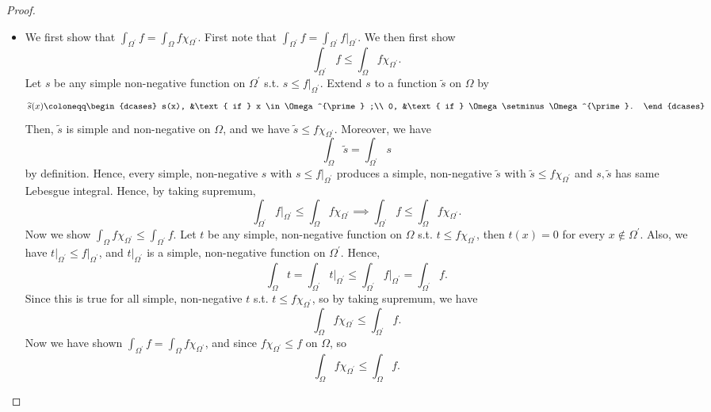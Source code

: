 \begin{proof}
\begin{itemize}
    \item [(e)] We first show that \(\int _{\Omega ^{\prime} } f = \int _{\Omega } f \chi _{\Omega ^{\prime} }\). First note that \(\int _{\Omega ^{\prime} } f = \int _{\Omega ^{\prime} } f\vert_{\Omega ^{\prime} }\). We then first show 
    \[
        \int _{\Omega ^{\prime} } f \le \int _\Omega f \chi _{\Omega ^{\prime} }.
    \]
    Let \(s\) be any simple non-negative function on \(\Omega ^{\prime} \) s.t. \(s \le f\vert_{\Omega ^{\prime} }\). Extend \(s\) to a function \(\widetilde{s} \) on \(\Omega \) by 
    \[
        \widetilde{s}(x) \coloneqq \begin{dcases}
            s(x), &\text{ if } x \in \Omega ^{\prime} ;\\
            0, &\text{ if } \Omega \setminus \Omega ^{\prime}.
        \end{dcases} 
    \]      
    Then, \(\widetilde{s} \) is simple and non-negative on \(\Omega\), and we have \(\widetilde{s} \le f \chi _{\Omega ^{\prime}} \). Moreover, we have 
    \[
        \int _{\Omega } \widetilde{s} = \int _{\Omega ^{\prime} } s 
    \]   
    by definition. Hence, every simple, non-negative \(s\) with \(s \le f\vert_{\Omega ^{\prime} }\) produces a simple, non-negative \(\widetilde{s}  \) with \(\widetilde{s} \le f \chi _{\Omega ^{\prime} } \) and \(s, \widetilde{s} \) has same Lebesgue integral. Hence, by taking supremum,
    \[
        \int _{\Omega ^{\prime} } f\vert_{\Omega ^{\prime} } \le \int _{\Omega } f \chi _{\Omega ^{\prime} } \implies \int _{\Omega ^{\prime} } f \le \int _{\Omega } f \chi _{\Omega ^{\prime} }.
    \]   
    Now we show \(\int _{\Omega } f \chi _{\Omega ^{\prime} } \le \int _{\Omega ^{\prime} } f\). Let \(t\) be any simple, non-negative function on \(\Omega\) s.t. \(t \le f \chi _{\Omega ^{\prime} }\), then \(t(x) = 0\) for every \(x \notin \Omega ^{\prime} \). Also, we have \(t\vert_{\Omega ^{\prime} } \le f \vert_{\Omega ^{\prime} }\), and \(t\vert_{\Omega ^{\prime} }\) is a simple, non-negative function on \(\Omega ^{\prime} \). Hence,
    \[
        \int _{\Omega } t = \int _{\Omega ^{\prime} } t\vert_{\Omega ^{\prime} } \le \int _{\Omega ^{\prime} } f\vert_{\Omega ^{\prime} } = \int _{\Omega ^{\prime} } f.
    \]         
    Since this is true for all simple, non-negative \(t\) s.t. \(t \le f \chi _{\Omega ^{\prime} }\), so by taking supremum, we have 
    \[
        \int _\Omega f \chi _{\Omega ^{\prime} } \le \int _{\Omega ^{\prime} } f.
    \] 
    Now we have shown \(\int _{\Omega ^{\prime} } f = \int _{\Omega } f \chi _{\Omega ^{\prime} }\), and since \(f \chi _{\Omega ^{\prime} } \le f\) on \(\Omega \), so 
    \[
        \int _\Omega f \chi _{\Omega ^{\prime} } \le \int _{\Omega } f.
    \]   
\end{itemize}
\end{proof}
